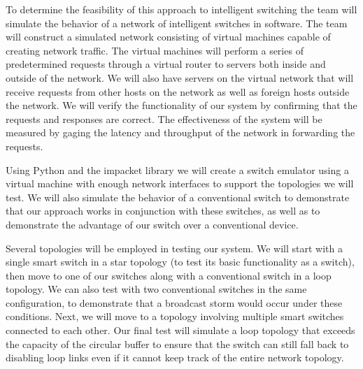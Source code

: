 \documentclass{article}
\begin{document}
	To determine the feasibility of this approach to intelligent switching the team will simulate the behavior of a network of intelligent switches in software.
	The team will construct a simulated network consisting of virtual machines capable of creating network traffic.
	The virtual machines will perform a series of predetermined requests through a virtual router to servers both inside and outside of the network.
	We will also have servers on the virtual network that will receive requests from other hosts on the network as well as foreign hosts outside the network.
	We will verify the functionality of our system by confirming that the requests and responses are correct.
	The effectiveness of the system will be measured by gaging the latency and throughput of the network in forwarding the requests.
	
	Using Python and the impacket library we will create a switch emulator using a virtual machine with enough network interfaces to support the topologies we will test.
	We will also simulate the behavior of a conventional switch to demonstrate that our approach works in conjunction with these switches, as well as to demonstrate the advantage of our switch over a conventional device.
	
	Several topologies will be employed in testing our system.
	We will start with a single smart switch in a star topology (to test its basic functionality as a switch), then move to one of our switches along with a conventional switch in a loop topology.
	We can also test with two conventional switches in the same configuration, to demonstrate that a broadcast storm would occur under these conditions.
	Next, we will move to a topology involving multiple smart switches connected to each other.
	Our final test will simulate a loop topology that exceeds the capacity of the circular buffer to ensure that the switch can still fall back to disabling loop links even if it cannot keep track of the entire network topology.
\end{document}
